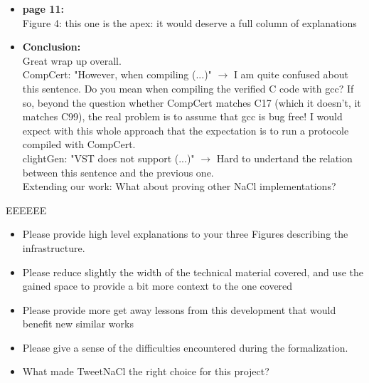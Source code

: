\begin{itemize}
    \item \textbf{page 11:}\\
          Figure 4: this one is the apex: it would deserve a full column of explanations

    \item \textbf{Conclusion:}\\
          Great wrap up overall.\\
          CompCert: "However, when compiling (...)" $\rightarrow$ I am quite confused about this sentence. Do you mean when compiling the verified C code with gcc? If so, beyond the question whether CompCert matches C17 (which it doesn't, it matches C99), the real problem is to assume that gcc is bug free! I would expect with this whole approach that the expectation is to run a protocole compiled with CompCert.\\
          clightGen: "VST does not support (...)" $\rightarrow$ Hard to undertand the relation between this sentence and the previous one.\\
          Extending our work: What about proving other NaCl implementations?
\end{itemize}

\begin{answer}{EEEEEE}
\end{answer}

\begin{center}
\end{center}
\begin{itemize}
    \item Please provide high level explanations to your three Figures describing the infrastructure.
    \item Please reduce slightly the width of the technical material covered, and use the gained space to provide a bit more context to the one covered
    \item Please provide more get away lessons from this development that would benefit new similar works
    \item Please give a sense of the difficulties encountered during the formalization.
\end{itemize}

\begin{center}
\end{center}

\begin{itemize}
    \item What made TweetNaCl the right choice for this project?
\end{itemize}

